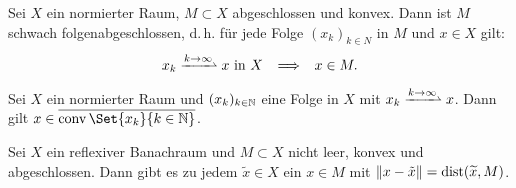 \documentclass{cheat-sheet}
\newcommand{\K}{\mathbb{K}}
\newcommand{\conv}{\mathop{\mathrm{conv}}} %
\newcommand{\convWeaklyWith}[1]{\xrightharpoonup{#1 \to \infty}} %
\begin{document}

\begin{satz}
  Sei $X$ ein normierter Raum, $M \subset X$ abgeschlossen und konvex. Dann ist $M$ schwach folgenabgeschlossen, d.\,h. für jede Folge $(x_k)_{k \in N}$ in $M$ und $x \in X$ gilt:
  \[ x_k \convWeaklyWith{k} x \text{ in } X \enspace \implies \enspace x \in M. \]
\end{satz}

\begin{lem}[Mazur]
  Sei $X$ ein normierter Raum und $(x_k)_{k \in \mathbb{N}}$ eine Folge in $X$ mit $x_k \convWeaklyWith{k} x$. Dann gilt $x \in \overline{\conv \Set{ x_k }{ k \in \N }}$.
\end{lem}

\begin{satz}
  Sei $X$ ein reflexiver Banachraum und $M \subset X$ nicht leer, konvex und abgeschlossen. Dann gibt es zu jedem $\widetilde{x} \in X$ ein $x \in M$ mit $\lVert x - \tilde{x}\rVert = \mathrm{dist}(\widetilde{x}, M)$.
\end{satz}









\end{document}
